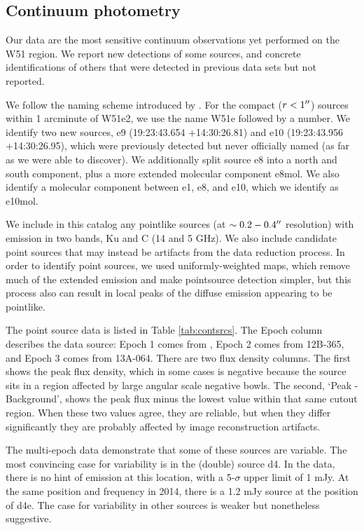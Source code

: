 \subsection{Continuum photometry}
Our data are the most sensitive continuum observations yet performed on the W51
region.  We report new detections of some sources, and concrete identifications
of others that were detected in previous data sets but not reported.

We follow the naming scheme introduced by \citet{Mehringer1994a}.  For the
compact ($r<1\mbox{$^{\prime\prime}$}$) sources within 1 arcminute of W51e2, we use the name
W51e followed by a number.  We identify two new sources, e9 (19:23:43.654
+14:30:26.81) and e10 (19:23:43.956 +14:30:26.95), which were previously
detected but never officially named (as far as we were able to discover).
We additionally split source e8 into a north and south component, plus a more
extended molecular component e8mol.  We also identify a molecular component
between e1, e8, and e10, which we identify as e10mol.

We include in this catalog any pointlike sources (at $\sim0.2-0.4\mbox{$^{\prime\prime}$}$
resolution) with emission in two bands, Ku and C (14 and 5 GHz).  We also
include candidate point sources that may instead be artifacts from the data
reduction process.  In order to identify point sources, we used
uniformly-weighted maps, which remove much of the extended emission and make
pointsource detection simpler, but this process also can result in local peaks
of the diffuse emission appearing to be pointlike.

The point source data is listed in Table \ref{tab:contsrcs}.  The Epoch column
describes the data source: Epoch 1 comes from \citet{Mehringer1994a}, Epoch 2
comes from 12B-365, and Epoch 3 comes from 13A-064.  There are two flux density
columns.  The first shows the peak flux density, which in some
cases is negative because the source sits in a region affected by large angular
scale negative bowls.  The second, `Peak - Background', shows the peak flux
minus the lowest value within that same cutout region.  When these two values
agree, they are reliable, but when they differ significantly they are probably
affected by image reconstruction artifacts.

The multi-epoch data demonstrate that some of these sources are variable.  The
most convincing case for variability is in the (double) source d4.  In the
\citet{Mehringer1994a} data, there is no hint of emission at this location,
with a 5-$\sigma$ upper limit of 1 mJy.  At the same position and frequency in
2014, there is a 1.2 mJy source at the position of d4e.  The case for
variability in other sources is weaker but nonetheless suggestive.

